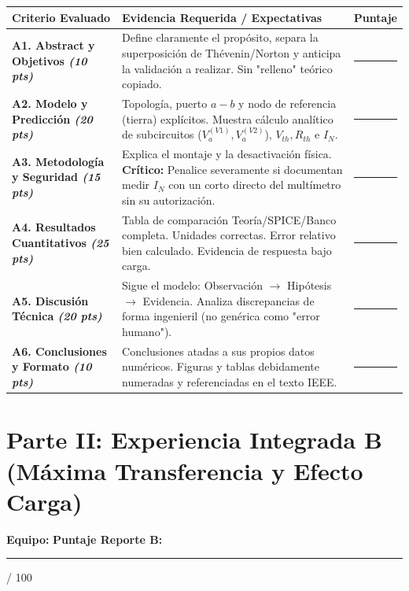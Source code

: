 \documentclass[11pt, a4paper]{article}
\begin{document}
\vspace{0.3cm}
\renewcommand{\arraystretch}{1.5}
\noindent
\begin{tabularx}{\textwidth}{>{\bfseries\RaggedRight}p{4cm} >{\RaggedRight\arraybackslash}X >{\centering\arraybackslash}p{1.5cm}}
\toprule
\textbf{Criterio Evaluado} & \textbf{Evidencia Requerida / Expectativas} & \textbf{Puntaje} \\ 
\midrule
A1. Abstract y Objetivos \newline \textit{(10 pts)} & Define claramente el propósito, separa la superposición de Thévenin/Norton y anticipa la validación a realizar. Sin "relleno" teórico copiado. & \rule{1cm}{0.4pt} \\ \addlinespace
A2. Modelo y Predicción \newline \textit{(20 pts)} & Topología, puerto $a-b$ y nodo de referencia (tierra) explícitos. Muestra cálculo analítico de subcircuitos ($V_a^{(V1)}, V_a^{(V2)}$), $V_{th}, R_{th}$ e $I_N$. & \rule{1cm}{0.4pt} \\ \addlinespace
A3. Metodología y Seguridad \newline \textit{(15 pts)} & Explica el montaje y la desactivación física. \textbf{Crítico:} Penalice severamente si documentan medir $I_N$ con un corto directo del multímetro sin su autorización. & \rule{1cm}{0.4pt} \\ \addlinespace
A4. Resultados Cuantitativos \newline \textit{(25 pts)} & Tabla de comparación Teoría/SPICE/Banco completa. Unidades correctas. Error relativo bien calculado. Evidencia de respuesta bajo carga. & \rule{1cm}{0.4pt} \\ \addlinespace
A5. Discusión Técnica \newline \textit{(20 pts)} & Sigue el modelo: Observación $\rightarrow$ Hipótesis $\rightarrow$ Evidencia. Analiza discrepancias de forma ingenieril (no genérica como "error humano"). & \rule{1cm}{0.4pt} \\ \addlinespace
A6. Conclusiones y Formato \newline \textit{(10 pts)} & Conclusiones atadas a sus propios datos numéricos. Figuras y tablas debidamente numeradas y referenciadas en el texto IEEE. & \rule{1cm}{0.4pt} \\ 
\bottomrule
\end{tabularx}

\newpage
\section*{Parte II: Experiencia Integrada B (Máxima Transferencia y Efecto Carga)}
\textbf{Equipo:} \hrulefill \quad \textbf{Puntaje Reporte B:} \rule{2cm}{0.4pt} / 100
\end{document}
